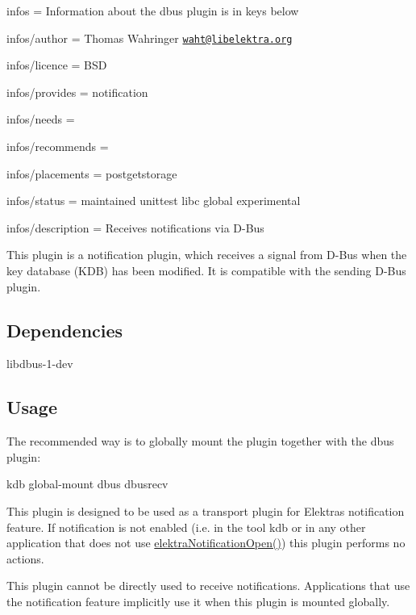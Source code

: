 
\begin{DoxyItemize}
\item infos = Information about the dbus plugin is in keys below
\item infos/author = Thomas Wahringer \href{mailto:waht@libelektra.org}{\tt waht@libelektra.\+org}
\item infos/licence = B\+SD
\item infos/provides = notification
\item infos/needs =
\item infos/recommends =
\item infos/placements = postgetstorage
\item infos/status = maintained unittest libc global experimental
\item infos/description = Receives notifications via D-\/\+Bus
\end{DoxyItemize}

This plugin is a notification plugin, which receives a signal from D-\/\+Bus when the key database (K\+DB) has been modified. It is compatible with the sending D-\/\+Bus plugin.

\subsection*{Dependencies}


\begin{DoxyItemize}
\item {\ttfamily libdbus-\/1-\/dev}
\end{DoxyItemize}

\subsection*{Usage}

The recommended way is to globally mount the plugin together with the dbus plugin\+: \begin{DoxyVerb}    kdb global-mount dbus dbusrecv
\end{DoxyVerb}


This plugin is designed to be used as a transport plugin for Elektra\textquotesingle{}s notification feature. If notification is not enabled (i.\+e. in the tool {\ttfamily kdb} or in any other application that does not use {\ttfamily \hyperlink{group__kdbnotification_gaeae96154abdb5fdbf1b34a01e2b23e44}{elektra\+Notification\+Open()}}) this plugin performs no actions.

This plugin cannot be directly used to receive notifications. Applications that use the notification feature implicitly use it when this plugin is mounted globally.

